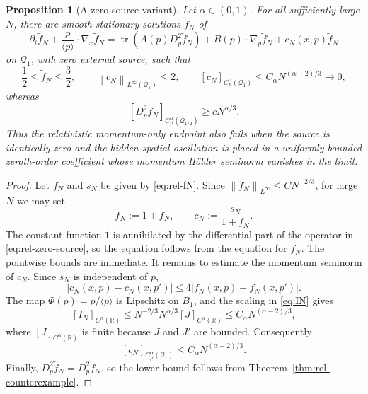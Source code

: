 \documentclass[11pt,reqno]{amsart}
\numberwithin{equation}{section}
\newtheorem{proposition}[theorem]{Proposition}
\theoremstyle{remark}
\DeclareMathOperator{\tr}{tr}
\newcommand{\R}{\mathbb R}
\newcommand{\norm}[1]{\left\|#1\right\|}
\newcommand{\la}[1]{\langle #1\rangle}
\begin{document}
\begin{proposition}[A zero-source variant]\label{prop:rel-zero-source}
Let $\alpha\in(0,1)$.  For all sufficiently large $N$, there are smooth stationary solutions
$\widetilde f_N$ of
\begin{equation}\label{eq:rel-zero-source}
   \partial_t\widetilde f_N+\frac p{\la p}\cdot\nabla_x\widetilde f_N
   =\tr\!\left(A(p)D_p^2\widetilde f_N\right)
    +B(p)\cdot\nabla_p\widetilde f_N+c_N(x,p)\widetilde f_N
\end{equation}
on $\mathcal Q_1$, with zero external source, such that
\[
   \frac12\le \widetilde f_N\le\frac32,
   \qquad
   \norm{c_N}_{L^\infty(\mathcal Q_1)}\le2,
   \qquad
   [c_N]_{C_p^\alpha(\mathcal Q_1)}
      \le C_\alpha N^{(\alpha-2)/3}\longrightarrow0,
\]
whereas
\[
   [D_p^2\widetilde f_N]_{C_p^\alpha(\mathcal Q_{1/2})}
   \ge cN^{\alpha/3}.
\]
Thus the relativistic momentum-only endpoint also fails when the source is identically zero and the hidden spatial oscillation is placed in a uniformly bounded zeroth-order coefficient whose momentum H\"older seminorm vanishes in the limit.
\end{proposition}

\begin{proof}
Let $f_N$ and $s_N$ be given by \eqref{eq:rel-fN}.  Since
$\norm{f_N}_{L^\infty}\le CN^{-2/3}$, for large $N$ we may set
\[
   \widetilde f_N:=1+f_N,
   \qquad
   c_N:=\frac{s_N}{1+f_N}.
\]
The constant function $1$ is annihilated by the differential part of the operator in
\eqref{eq:rel-zero-source}, so the equation follows from the equation for $f_N$.
The pointwise bounds are immediate. It remains to estimate the momentum seminorm of $c_N$.  Since $s_N$ is independent of $p$,
\[
   |c_N(x,p)-c_N(x,p')|
   \le4|f_N(x,p)-f_N(x,p')|.
\]
The map $\Phi(p)=p/\la p$ is Lipschitz on $B_1$, and the scaling in
\eqref{eq:IN} gives
\[
   [I_N]_{C^\alpha(\R)}
   \le N^{-2/3}N^{\alpha/3}[J]_{C^\alpha(\R)}
   \le C_\alpha N^{(\alpha-2)/3},
\]
where $[J]_{C^\alpha(\R)}$ is finite because $J$ and $J'$ are bounded.
Consequently
\[
   [c_N]_{C_p^\alpha(\mathcal Q_1)}
   \le C_\alpha N^{(\alpha-2)/3}.
\]
Finally, $D_p^2\widetilde f_N=D_p^2f_N$, so the lower bound follows from
Theorem~\ref{thm:rel-counterexample}.
\end{proof}
\end{document}
